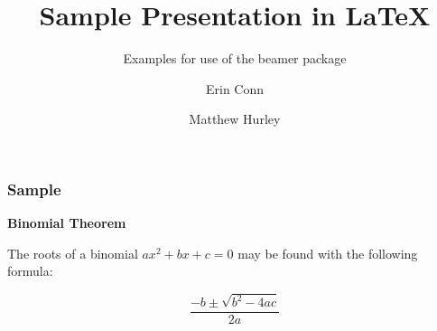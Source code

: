 \documentclass{beamer}
\title[Presentation] %
{Sample Presentation in LaTeX}
\subtitle{Examples for use of the beamer package}
\author[Conn, Hurley] %
{Erin Conn \and Matthew Hurley}
\begin{document}
    \frame{\titlepage}
    
    \begin{frame}
        \frametitle{Sample}

        \textbf{Binomial Theorem}

        The roots of a binomial \(ax^2+bx+c=0\) may be found with the
        following formula:

        \[ \frac{-b \pm \sqrt{b^2-4ac}}{2a} \]

    \end{frame}
\end{document}
